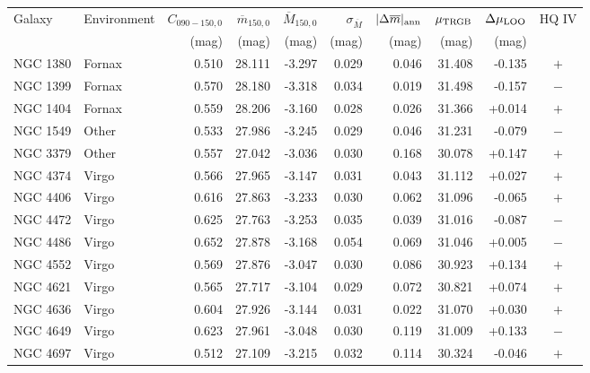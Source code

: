 \begin{tabular}{llrrrrrrrc}
\toprule
Galaxy & Environment & $C_{090-150,0}$ & $\overline m_{150,0}$ &
$\overline M_{150,0}$ & $\sigma_{\overline M}$ &
$|\Delta\overline m|_{\rm ann}$ & $\mu_{\rm TRGB}$ &
$\Delta\mu_{\rm LOO}$ & HQ IV \\
 & & (mag) & (mag) & (mag) & (mag) & (mag) & (mag) & (mag) & \\
\midrule
NGC 1380 & Fornax & 0.510 & 28.111 & -3.297 & 0.029 & 0.046 & 31.408 & -0.135 & $+$ \\
NGC 1399 & Fornax & 0.570 & 28.180 & -3.318 & 0.034 & 0.019 & 31.498 & -0.157 & $-$ \\
NGC 1404 & Fornax & 0.559 & 28.206 & -3.160 & 0.028 & 0.026 & 31.366 & +0.014 & $+$ \\
NGC 1549 & Other & 0.533 & 27.986 & -3.245 & 0.029 & 0.046 & 31.231 & -0.079 & $-$ \\
NGC 3379 & Other & 0.557 & 27.042 & -3.036 & 0.030 & 0.168 & 30.078 & +0.147 & $+$ \\
NGC 4374 & Virgo & 0.566 & 27.965 & -3.147 & 0.031 & 0.043 & 31.112 & +0.027 & $+$ \\
NGC 4406 & Virgo & 0.616 & 27.863 & -3.233 & 0.030 & 0.062 & 31.096 & -0.065 & $+$ \\
NGC 4472 & Virgo & 0.625 & 27.763 & -3.253 & 0.035 & 0.039 & 31.016 & -0.087 & $-$ \\
NGC 4486 & Virgo & 0.652 & 27.878 & -3.168 & 0.054 & 0.069 & 31.046 & +0.005 & $-$ \\
NGC 4552 & Virgo & 0.569 & 27.876 & -3.047 & 0.030 & 0.086 & 30.923 & +0.134 & $+$ \\
NGC 4621 & Virgo & 0.565 & 27.717 & -3.104 & 0.029 & 0.072 & 30.821 & +0.074 & $+$ \\
NGC 4636 & Virgo & 0.604 & 27.926 & -3.144 & 0.031 & 0.022 & 31.070 & +0.030 & $+$ \\
NGC 4649 & Virgo & 0.623 & 27.961 & -3.048 & 0.030 & 0.119 & 31.009 & +0.133 & $-$ \\
NGC 4697 & Virgo & 0.512 & 27.109 & -3.215 & 0.032 & 0.114 & 30.324 & -0.046 & $+$ \\
\bottomrule
\end{tabular}
